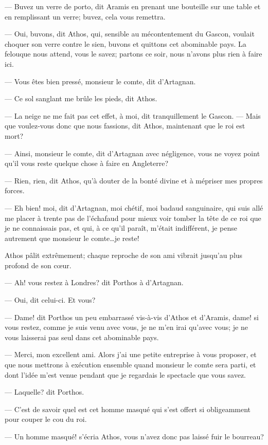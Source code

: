 — Buvez un verre de porto, dit Aramis en prenant une bouteille sur une table et en remplissant un verre; buvez, cela vous remettra.

— Oui, buvons, dit Athos, qui, sensible au mécontentement du Gascon, voulait choquer son verre contre le sien, buvons et quittons cet abominable pays. La felouque nous attend, vous le savez; partons ce soir, nous n'avons plus rien à faire ici.

— Vous êtes bien pressé, monsieur le comte, dit d'Artagnan.

— Ce sol sanglant me brûle les pieds, dit Athos.

— La neige ne me fait pas cet effet, à moi, dit tranquillement le Gascon.
— Mais que voulez-vous donc que nous fassions, dit Athos, maintenant que le roi est mort?

— Ainsi, monsieur le comte, dit d'Artagnan avec négligence, vous ne voyez point qu'il vous reste quelque chose à faire en Angleterre?

— Rien, rien, dit Athos, qu'à douter de la bonté divine et à mépriser mes propres forces.

— Eh bien! moi, dit d'Artagnan, moi chétif, moi badaud sanguinaire, qui suis allé me placer à trente pas de l'échafaud pour mieux voir tomber la tête de ce roi que je ne connaissais pas, et qui, à ce qu'il paraît, m'était indifférent, je pense autrement que monsieur le comte\dots je reste!

Athos pâlit extrêmement; chaque reproche de son ami vibrait jusqu'au plus profond de son cœur.

— Ah! vous restez à Londres? dit Porthos à d'Artagnan.

— Oui, dit celui-ci. Et vous?

— Dame! dit Porthos un peu embarrassé vis-à-vis d'Athos et d'Aramis, dame! si vous restez, comme je suis venu avec vous, je ne m'en irai qu'avec vous; je ne vous laisserai pas seul dans cet abominable pays.

— Merci, mon excellent ami. Alors j'ai une petite entreprise à vous proposer, et que nous mettrons à exécution ensemble quand monsieur le comte sera parti, et dont l'idée m'est venue pendant que je regardais le spectacle que vous savez.

— Laquelle? dit Porthos.

— C'est de savoir quel est cet homme masqué qui s'est offert si obligeamment pour couper le cou du roi.

— Un homme masqué! s'écria Athos, vous n'avez donc pas laissé fuir le bourreau?

